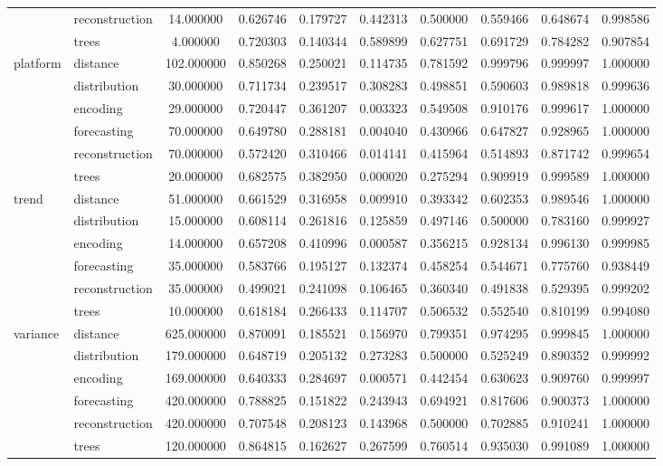 \begin{tabular}{|l|l|c|c|c|c|c|c|c|c|}
 & reconstruction & 14.000000 & 0.626746 & 0.179727 & 0.442313 & 0.500000 & 0.559466 & 0.648674 & 0.998586 \\
 & trees & 4.000000 & 0.720303 & 0.140344 & 0.589899 & 0.627751 & 0.691729 & 0.784282 & 0.907854 \\
\cline{1-10}
\multirow[t]{6}{*}{platform} & distance & 102.000000 & 0.850268 & 0.250021 & 0.114735 & 0.781592 & 0.999796 & 0.999997 & 1.000000 \\
 & distribution & 30.000000 & 0.711734 & 0.239517 & 0.308283 & 0.498851 & 0.590603 & 0.989818 & 0.999636 \\
 & encoding & 29.000000 & 0.720447 & 0.361207 & 0.003323 & 0.549508 & 0.910176 & 0.999617 & 1.000000 \\
 & forecasting & 70.000000 & 0.649780 & 0.288181 & 0.004040 & 0.430966 & 0.647827 & 0.928965 & 1.000000 \\
 & reconstruction & 70.000000 & 0.572420 & 0.310466 & 0.014141 & 0.415964 & 0.514893 & 0.871742 & 0.999654 \\
 & trees & 20.000000 & 0.682575 & 0.382950 & 0.000020 & 0.275294 & 0.909919 & 0.999589 & 1.000000 \\
\cline{1-10}
\multirow[t]{6}{*}{trend} & distance & 51.000000 & 0.661529 & 0.316958 & 0.009910 & 0.393342 & 0.602353 & 0.989546 & 1.000000 \\
 & distribution & 15.000000 & 0.608114 & 0.261816 & 0.125859 & 0.497146 & 0.500000 & 0.783160 & 0.999927 \\
 & encoding & 14.000000 & 0.657208 & 0.410996 & 0.000587 & 0.356215 & 0.928134 & 0.996130 & 0.999985 \\
 & forecasting & 35.000000 & 0.583766 & 0.195127 & 0.132374 & 0.458254 & 0.544671 & 0.775760 & 0.938449 \\
 & reconstruction & 35.000000 & 0.499021 & 0.241098 & 0.106465 & 0.360340 & 0.491838 & 0.529395 & 0.999202 \\
 & trees & 10.000000 & 0.618184 & 0.266433 & 0.114707 & 0.506532 & 0.552540 & 0.810199 & 0.994080 \\
\cline{1-10}
\multirow[t]{6}{*}{variance} & distance & 625.000000 & 0.870091 & 0.185521 & 0.156970 & 0.799351 & 0.974295 & 0.999845 & 1.000000 \\
 & distribution & 179.000000 & 0.648719 & 0.205132 & 0.273283 & 0.500000 & 0.525249 & 0.890352 & 0.999992 \\
 & encoding & 169.000000 & 0.640333 & 0.284697 & 0.000571 & 0.442454 & 0.630623 & 0.909760 & 0.999997 \\
 & forecasting & 420.000000 & 0.788825 & 0.151822 & 0.243943 & 0.694921 & 0.817606 & 0.900373 & 1.000000 \\
 & reconstruction & 420.000000 & 0.707548 & 0.208123 & 0.143968 & 0.500000 & 0.702885 & 0.910241 & 1.000000 \\
 & trees & 120.000000 & 0.864815 & 0.162627 & 0.267599 & 0.760514 & 0.935030 & 0.991089 & 1.000000 \\
\cline{1-10}
\bottomrule
\end{tabular}
